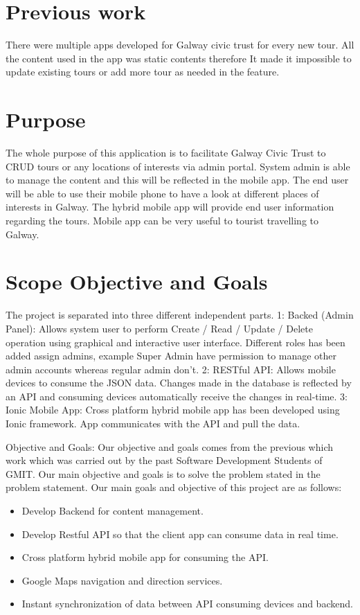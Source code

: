 	\section {Previous work}
	There were multiple apps developed for Galway civic trust for every new tour. All the content used in the app was static contents therefore It made it impossible to update existing tours or add more tour as needed in the feature.
	
	\section {Purpose}
	The whole purpose of this application is to facilitate Galway Civic Trust to CRUD tours or any locations of interests via admin portal. System admin is able to manage the content and this will be reflected in the mobile app.  The end user will be able to use their mobile phone to have a look at different places of interests in Galway.  The hybrid mobile app will provide end user information regarding the tours. Mobile app can be very useful to tourist travelling to Galway.
	
	\section {Scope Objective and Goals}
	The project is separated into three different independent parts.
	1: Backed (Admin Panel): Allows system user to perform Create / Read / Update / Delete operation using graphical and interactive user interface. Different roles has been added assign admins, example Super Admin have permission to manage other admin accounts whereas regular admin don’t.
	2: RESTful API: Allows mobile devices to consume the JSON data. Changes made in the database is reflected by an API and consuming devices automatically receive the changes in real-time.
	3: Ionic Mobile App: Cross platform hybrid mobile app has been developed using Ionic framework.  App communicates with the API and pull the data.
	
	 Objective and Goals: Our objective and goals comes from the previous which work which was carried out by the past Software Development Students of GMIT. Our main objective and goals is to solve the problem stated in the problem statement. Our main goals and objective of this project are as follows:
	 \begin{itemize}
		 \item Develop Backend for content management.
		\item Develop Restful API so that the client app can consume data in real time. 
		\item Cross platform hybrid mobile app for consuming the API.
		\item Google Maps navigation and direction services.
		\item Instant synchronization of data  between API consuming devices and backend. 
	\end{itemize}
